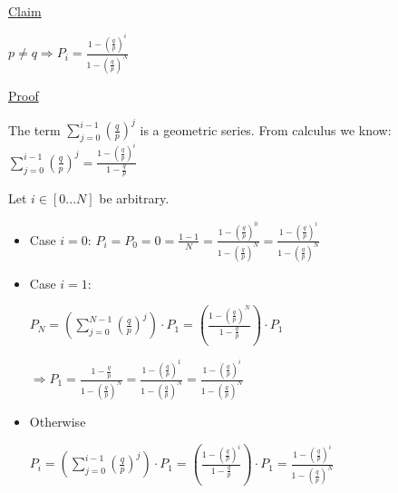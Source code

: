 ~\\

\underline{Claim} 

$p \neq q \Rightarrow P_i = \frac{1 - \left(\frac{q}{p}\right)^i}{1 - \left(\frac{q}{p}\right)^N}$

\underline{Proof}

The term $\sum\limits_{j = 0}^{i - 1} \left(\frac{q}{p}\right)^j$ is a geometric series. From calculus we know:
$\sum\limits_{j = 0}^{i - 1} \left(\frac{q}{p}\right)^j = \frac{1 - \left(\frac{q}{p}\right)^i}{1 - \frac{q}{p}}$

Let $i \in [0...N]$ be arbitrary.

\begin{itemize}
    \item Case $i = 0$: $P_i = P_0 = 0 = \frac{1 - 1}{N} 
    = \frac{1 - \left(\frac{q}{p}\right)^0}{1 - \left(\frac{q}{p}\right)^N}
    = \frac{1 - \left(\frac{q}{p}\right)^i}{1 - \left(\frac{q}{p}\right)^N}$ 
    
    \item Case $i = 1$: 
    
    $P_N 
    = \left(\sum\limits_{j = 0}^{N - 1} \left(\frac{q}{p}\right)^j \right) \cdot P_1
    = \left(\frac{1 - \left(\frac{q}{p}\right)^N}{1 - \frac{q}{p}} \right) \cdot P_1$
    
    $\Rightarrow P_1 
    = \frac{1 - \frac{q}{p}}{1 - \left(\frac{q}{p}\right)^N} 
    = \frac{1 - \left(\frac{q}{p}\right)^1}{1 - \left(\frac{q}{p}\right)^N}
    = \frac{1 - \left(\frac{q}{p}\right)^i}{1 - \left(\frac{q}{p}\right)^N}$ 
    
    
    \item Otherwise
    
    $P_i 
    = \left(\sum\limits_{j = 0}^{i - 1} \left(\frac{q}{p}\right)^j \right) \cdot P_1
    = \left(\frac{1 - \left(\frac{q}{p}\right)^i}{1 - \frac{q}{p}} \right) \cdot P_1
    = \frac{1 - \left(\frac{q}{p}\right)^i}{1 - \left(\frac{q}{p}\right)^N}$
    
\end{itemize}

\pagebreak